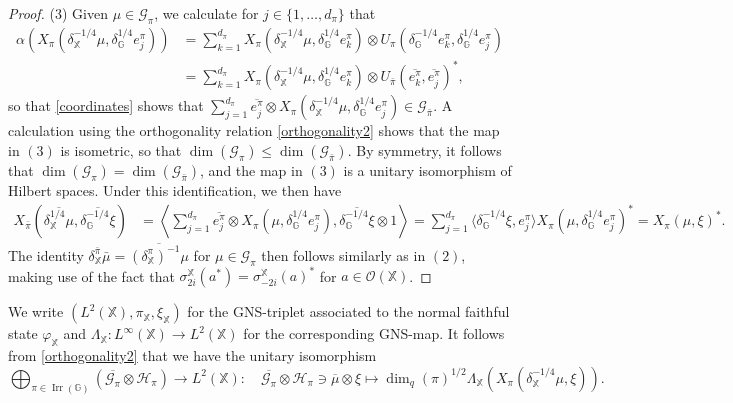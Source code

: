 \documentclass[reqno]{amsart}
\numberwithin{equation}{section}
\DeclareMathOperator{\Irr}{\mathrm{Irr}}
\newcommand{\mcG}{\mathcal{G}}
\newcommand{\mcH}{\mathcal{H}}
\newcommand{\mcO}{\mathcal{O}}
\newcommand{\G}{\mathbb{G}}
\newcommand{\X}{\mathbb{X}}
\begin{document}
\begin{proof}
(3) Given $\mu \in \mcG_\pi$, we calculate for $j\in \{1, \dots, d_\pi\}$ that
\begin{align*}
    \alpha(X_\pi(\delta_\X^{-1/4}\mu, \delta_\G^{1/4}e_j^\pi)) &= \sum_{k=1}^{d_\pi} X_\pi(\delta_\X^{-1/4} \mu, \delta_\G^{1/4}e_k^\pi) \otimes U_\pi(\delta_\G^{-1/4}e_k^\pi, \delta_\G^{1/4}e_j^\pi)\\
    &= \sum_{k=1}^{d_\pi} X_\pi(\delta_\X^{-1/4}\mu, \delta_\G^{1/4}e_k^\pi)\otimes U_{\bar{\pi}}(\overline{e_k^\pi}, \overline{e_j^\pi})^*,
\end{align*}
so that \eqref{coordinates} shows that $\sum_{j=1}^{d_\pi} \overline{e_j^\pi}\otimes X_\pi(\delta_\X^{-1/4}\mu, \delta_\G^{1/4}e_j^\pi)\in \mcG_{\bar{\pi}}$. A calculation using the orthogonality relation \eqref{orthogonality2} shows that the map in $(3)$ is isometric, so that $\dim(\mcG_\pi)\le \dim(\mcG_{\bar{\pi}})$. By symmetry, it follows that $\dim(\mcG_\pi)= \dim(\mcG_{\bar{\pi}})$, and the map in $(3)$ is a unitary isomorphism of Hilbert spaces. Under this identification, we then have
\begin{align*}
    X_{\bar{\pi}}(\overline{\delta_\X^{1/4}\mu}, \overline{\delta_\G^{-1/4}\xi}) &= \left\langle \sum_{j=1}^{d_\pi} \overline{e_j^\pi}\otimes X_\pi(\mu, \delta_\G^{1/4}e_j^\pi), \overline{\delta_\G^{-1/4}\xi}\otimes 1\right\rangle= \sum_{j=1}^{d_\pi} \langle \delta_\G^{-1/4}\xi, e_j^\pi\rangle X_\pi(\mu, \delta_\G^{1/4}e_j^\pi)^*= X_\pi(\mu, \xi)^*.
\end{align*}
The identity $\delta^{\bar{\pi}}_\X \bar{\mu}= \overline{(\delta_\X^{\pi})^{-1} \mu}$ for $\mu \in \mcG_\pi$ then follows similarly as in $(2)$, making use of the fact that $\sigma_{2i}^\X(a^*) = \sigma_{-2i}^\X(a)^*$ for $a\in \mcO(\X)$. 
\end{proof}


We write $(L^2(\X), \pi_\X, \xi_\X)$ for the GNS-triplet associated to the normal faithful state $\varphi_\X$ and $\Lambda_\X: L^\infty(\X)\to L^2(\X)$ for the corresponding GNS-map. It follows from \eqref{orthogonality2} that we have the unitary isomorphism
\begin{equation}\label{unitaryiso}
    \bigoplus_{\pi \in \Irr(\G)} (\overline{\mcG_\pi}\otimes \mcH_\pi) \to L^2(\X):\quad \overline{\mcG_\pi}\otimes \mcH_\pi\ni \overline{\mu} \otimes \xi \mapsto \dim_q(\pi)^{1/2}\Lambda_\X(X_\pi(\delta_\X^{-1/4}\mu, \xi)).
\end{equation} 
\end{document}
